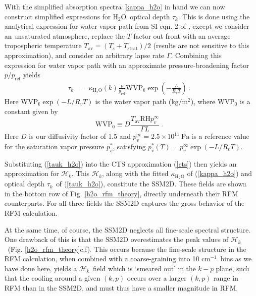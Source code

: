 \documentclass{ametsoc}
\newcommand{\beqn}{\begin{equation}}
\newcommand{\eeqn}{\end{equation}}
\newcommand{\eqnref}[1]{(\ref{#1})}
\newcommand{\comment}[1]{\textcolor{blue}{[{#1}]}}
\newcommand{\kg}{\ensuremath{\mathrm{kg}}}
\newcommand{\meter}{\ensuremath{\mathrm{m}}}
\newcommand{\cminverse}{\ensuremath{\mathrm{cm^{-1}}}}
\newcommand{\Pa}{\ensuremath{\mathrm{Pa}}}
\newcommand{\Rv}{\ensuremath{R_v}}
\newcommand{\Ts}{\ensuremath{T_\mathrm{s}}}
\newcommand{\htwo}{\ensuremath{\mathrm{H_2O}}}
\newcommand{\RH}{\ensuremath{\mathrm{RH}}}
\newcommand{\ch}{\ensuremath{\mathcal{H}}}
\newcommand{\chk}{\ensuremath{\ch_k}}
\newcommand{\tauk}{\ensuremath{\tau_k}}
\newcommand{\pref}{\ensuremath{p_{\mathrm{ref}}}}
\newcommand{\WVP}{\ensuremath{\mathrm{WVP}}}
\newcommand{\Tav}{\ensuremath{T_{\mathrm{av}}}}
\newcommand{\Tstrat}{\ensuremath{T_{\mathrm{strat}}}}
\begin{document}
With the simplified absorption spectra \eqref{kappa_h2o} in hand we can now construct simplified expressions for \htwo\  optical depth \tauk. This is done using the analytical expression for water vapor path from SI eqn. 2 of  \cite{koll2018}, except we consider an unsaturated atmosphere, replace the $T$ factor out front with an average tropospheric temperature $\Tav = (\Ts+\Tstrat)/2$ (results are not sensitive to this approximation), and consider an arbitrary lapse rate $\Gamma$. Combining this expression for water vapor path with an approximate pressure-broadening factor $p/\pref$  yields
\begin{align}
	 \tauk & = \kappa_{\htwo}(k)\frac{p}{\pref}\WVP_0 \exp\left(-\frac{L}{\Rv T}\right) \ .
	\label{tauk_h2o} 
\end{align}
Here $\WVP_0\exp(-L/\Rv T)$ is the water vapor path ($\kg/\meter^2$), where $\WVP_0$ is a constant given by
\beqn
	\WVP_0\equiv D \frac{\Tav \RH p_v^\infty}{\Gamma L}\  . 
	\label{WVP0}
\eeqn
 Here $D$ is our diffusivity factor of 1.5 and $p_v^\infty=2.5\times 10^{11}\ \Pa$ is a reference value for the saturation vapor pressure $p^*_v$, satisfying $p^*_v(T) = p^\infty_v \exp(-L/\Rv T)$.

  Substituting \eqnref{tauk_h2o} into the CTS approximation \eqnref{cts} then yields an approximation for  \chk. This \chk, along with the fitted $\kappa_{\htwo}$ of \eqnref{kappa_h2o} and optical depth  \tauk\ of \eqnref{tauk_h2o}, constitute the SSM2D. These fields are shown in the bottom row of Fig. \ref{h2o_rfm_theory}, directly underneath their RFM counterparts. For all three fields the SSM2D captures the gross behavior of the RFM calculation.
  
 At the same time, of course, the SSM2D neglects all  fine-scale spectral structure. One drawback of this is that the SSM2D  overestimates the peak values of \chk\  (Fig. \ref{h2o_rfm_theory}c,f). This  occurs because the fine-scale structure in the RFM calculation, when combined with a coarse-graining into 10 \cminverse\ bins as we have done here, yields a \chk\ field which is `smeared out' in  the $k-p$ plane, such that the cooling around a given $(k,p)$ occurs over a larger $(k,p)$ range in RFM than in the SSM2D, and must thus have a smaller magnitude in RFM. 
 
\end{document}
